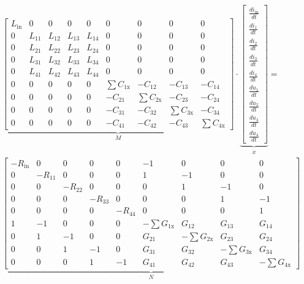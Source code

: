 \begin{refsection}
{\footnotesize 
\begin{align}
			&
			\underbrace{\begin{bmatrix}
			L_\mathrm{in}&0&0&0&0 & 0&0&0&0 \\
			0&L_{11}&L_{12}&L_{13}&L_{14} & 0&0&0&0 \\
			0&L_{21}&L_{22}&L_{23}&L_{24} & 0&0&0&0 \\
			0&L_{31}&L_{32}&L_{33}&L_{34} & 0&0&0&0 \\
			0&L_{41}&L_{42}&L_{43}&L_{44} & 0&0&0&0 \\
			0&0&0&0&0 & \sum{C_{1\mathrm{x}}}&-C_{12}&-C_{13}&-C_{14} \\
			0&0&0&0&0 & -C_{21}&\sum{C_{2\mathrm{x}}}&-C_{23}&-C_{24} \\
			0&0&0&0&0 & -C_{31}&-C_{32}&\sum{C_{3\mathrm{x}}}&-C_{34} \\
			0&0&0&0&0 & -C_{41}&-C_{42}&-C_{43}&\sum{C_{4\mathrm{x}}}
			    \end{bmatrix}}_{\text{$M$}}
			\cdot
			\underbrace{\begin{bmatrix}
			\frac{di_\mathrm{in}}{dt} \\
			\frac{di_1}{dt} \\
			\frac{di_2}{dt} \\
			\frac{di_3}{dt} \\
			\frac{di_4}{dt} \\
			\frac{du_1}{dt} \\
			\frac{du_2}{dt} \\
			\frac{du_3}{dt} \\
			\frac{du_4}{dt}
			\end{bmatrix}}_{\text{$\dot{x}$}}
			= \nonumber \\
			&
			\underbrace{\begin{bmatrix}
			-R_\mathrm{in}&0&0&0&0 & -1&0&0&0 \\
			0&-R_{11}&0&0&0 & 1&-1&0&0 \\
			0&0&-R_{22}&0&0 & 0&1&-1&0 \\
			0&0&0&-R_{33}&0 & 0&0&1&-1 \\
			0&0&0&0&-R_{44} & 0&0&0&1 \\
			1&-1&0&0&0 & -\sum G_{1\mathrm{x}}&G_{12}&G_{13}&G_{14} \\
			0&1&-1&0&0 & G_{21} &- \sum G_{2\mathrm{x}}& G_{23}& G_{24} \\
			0&0&1&-1&0 & G_{31} & G_{32} &-\sum G_{3\mathrm{x}}&G_{34} \\
			0&0&0&1&-1 & G_{41}&G_{42}&G_{43}&-\sum G_{4\mathrm{x}}
			\end{bmatrix}}_{\text{$N$}}

\end{align}}
\end{refsection}
